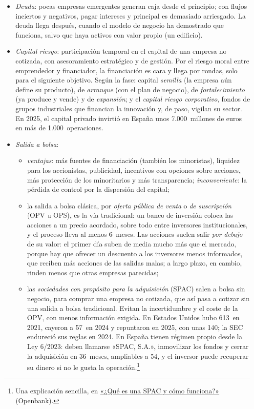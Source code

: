 \documentclass[11pt]{article}
\begin{document}
\begin{anotaciones}
\begin{itemize}
\item \emph{Deuda}: pocas empresas emergentes generan caja desde el principio; con flujos inciertos y negativos, pagar intereses y principal es demasiado arriesgado. La deuda llega después, cuando el modelo de negocio ha demostrado que funciona, salvo que haya activos con valor propio (un edificio).
\item \emph{Capital riesgo}: participación temporal en el capital de una empresa no cotizada, con asesoramiento estratégico y de gestión. Por el riesgo moral entre emprendedor y financiador, la financiación es cara y llega por rondas, solo para el siguiente objetivo. Según la fase: capital \emph{semilla} (la empresa aún define su producto), de \emph{arranque} (con el plan de negocio), de \emph{fortalecimiento} (ya produce y vende) y de \emph{expansión}; y el \emph{capital riesgo corporativo}, fondos de grupos industriales que financian la innovación y, de paso, vigilan su sector. En 2025, el capital privado invirtió en España unos 7.000~millones de euros en más de 1.000~operaciones\nocite{SpainCap2026Estimacion}.
\item \emph{Salida a bolsa}:
  \begin{itemize}
  \item \emph{ventajas}: más fuentes de financiación (también los minoristas), liquidez para los accionistas, publicidad, incentivos con opciones sobre acciones, más protección de los minoritarios y más transparencia; \emph{inconveniente}: la pérdida de control por la dispersión del capital;
  \item la salida a bolsa clásica, por \emph{oferta pública de venta} o \emph{de suscripción} (OPV u OPS), es la vía tradicional: un banco de inversión coloca las acciones a un precio acordado, sobre todo entre inversores institucionales, y el proceso lleva al menos 6~meses. Las acciones suelen salir \emph{por debajo} de su valor: el primer día suben de media mucho más que el mercado\nocite{Ibbotson1975Price}, porque hay que ofrecer un descuento a los inversores menos informados, que reciben más acciones de las salidas malas\nocite{Rock1986Why}; a largo plazo, en cambio, rinden menos que otras empresas parecidas\nocite{Ritter1991Long};
  \item las \emph{sociedades con propósito para la adquisición} (SPAC) salen a bolsa sin negocio, para comprar una empresa no cotizada, que así pasa a cotizar sin una salida a bolsa tradicional. Evitan la incertidumbre y el coste de la OPV, con menos información exigida. En Estados Unidos hubo 613~en 2021, cayeron a 57~en 2024 y repuntaron en 2025, con unas 140\nocite{SPACInsider2025H1}; la SEC endureció sus reglas en 2024\nocite{SEC2024SPAC}. En España tienen régimen propio desde la Ley 6/2023: deben llamarse «SPAC, S.A.», inmovilizar los fondos y cerrar la adquisición en 36~meses, ampliables a 54, y el inversor puede recuperar su dinero si no le gusta la operación\nocite{BOE2023LMV}.\footnote{Una explicación sencilla, en \href{https://www.openbank.es/open-to-learn/spac}{«¿Qué es una SPAC y cómo funciona?»} (Openbank).}

\end{itemize}
\end{itemize}
\end{anotaciones}
\end{document}
